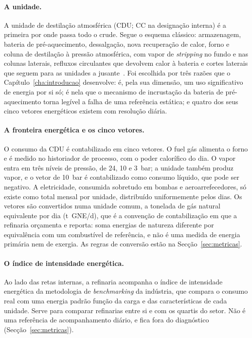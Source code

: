 \paragraph{A unidade.} A unidade de destilação atmosférica (CDU; CC na
designação interna) é a primeira por onde passa todo o crude. Segue o
esquema clássico: armazenagem, bateria de pré-aquecimento, dessalgação,
nova recuperação de calor, forno e coluna de destilação à pressão
atmosférica, com vapor de \emph{stripping} no fundo e nas colunas laterais,
refluxos circulantes que devolvem calor à bateria e cortes laterais que
seguem para as unidades a jusante~\cite{Gary2007}. Foi escolhida por três
razões que o Capítulo~\ref{cha:introducao} desenvolve: é, pela sua dimensão,
um uso significativo de energia por si só; é nela que o mecanismo de
incrustação da bateria de pré-aquecimento torna legível a falha de uma
referência estática; e quatro dos seus cinco vetores energéticos existem
com resolução diária.

\paragraph{A fronteira energética e os cinco vetores.} O consumo da CDU é
contabilizado em cinco vetores. O fuel gás alimenta o forno e é medido no
historiador de processo, com o poder calorífico do dia. O vapor entra em três
níveis de pressão, de 24, 10 e 3~bar; a unidade também produz vapor, e o vetor
de 10~bar é contabilizado como consumo líquido, que pode ser negativo. A eletricidade,
consumida sobretudo em bombas e aeroarrefecedores, só existe como total
mensal por unidade, distribuído uniformemente pelos dias. Os vetores são
convertidos numa unidade comum, a tonelada de gás natural equivalente por
dia (t~GNE/d), que é a convenção de contabilização em que a refinaria
orçamenta e reporta: soma energias de natureza diferente por equivalência
com um combustível de referência, e não é uma medida de energia primária nem
de exergia. As regras de conversão estão na Secção~\ref{sec:metricas}.

\paragraph{O índice de intensidade energética.} Ao lado das retas internas, a
refinaria acompanha o índice de intensidade energética da metodologia de
\emph{benchmarking} da indústria, que compara o consumo real com uma energia
padrão função da carga e das características de cada unidade. Serve para
comparar refinarias entre si e com os quartis do setor. Não é uma
referência de acompanhamento diário, e fica fora do diagnóstico
(Secção~\ref{sec:metricas}).

